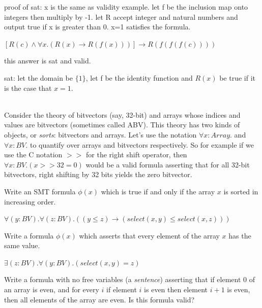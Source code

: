 \documentclass[11pt]{article}
\begin{document}
\begin{qunlist}
\begin{qparts}
\begin{answer}
      proof of sat:
      x is the same as validity example. let f be the inclusion map onto integers then multiply by -1. let R accept integer and natural numbers and output true if x is greater than 0. x=1 satisfies the formula.

    \end{answer}

  \item
    $\left[ R(c) \land \forall x . (R(x) \rightarrow R(f(x))) \right] \rightarrow R(f(f(f(c))))$

    \begin{answer}
      this answer is sat and valid.

      sat:
      let the domain be \(\{1\}\), let f be the identity function and \(R(x)\) be true if it is the case that \(x=1\).
    \end{answer}
  \end{qparts}

  \\
  Consider the theory of bitvectors (say, 32-bit) and arrays whose indices and values are bitvectors (sometimes called ABV).
  This theory has two kinds of objects, or \emph{sorts}: bitvectors and arrays.
  Let's use the notation $\forall x : Array .$ and $\forall x : BV .$ to quantify over arrays and bitvectors respectively.
  So for example if we use the C notation $>>$ for the right shift operator, then $\forall x : BV . (x >> 32 = 0)$ would be a valid formula asserting that for all 32-bit bitvectors, right shifting by 32 bits yields the zero bitvector.
  \begin{qparts}
  \item
    Write an SMT formula $\phi(x)$ which is true if and only if the array $x$ is sorted in increasing order.

    \begin{answer}
      \(      \forall (y:BV).\forall (z:BV). \left( (y\leq z) \rightarrow(select(x,y)\leq select(x,z)) \right)
      \)
    \end{answer}

  \item
    Write a formula $\phi(x)$ which asserts that every element of the array $x$ has the same value.

    \begin{answer}
      \(\exists (z:BV).\forall( y:BV).(select(x,y)=z)\)
    \end{answer}

  \item
    Write a formula with no free variables (a \emph{sentence}) asserting that if element 0 of an array is even, and for every $i$ if element $i$ is even then element $i+1$ is even, then all elements of the array are even.
    Is this formula valid?


\end{qparts}
\end{qunlist}
\end{document}
